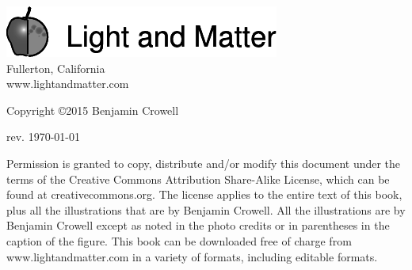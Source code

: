 \thispagestyle{empty}

\vspace{100mm}

\noindent
\includegraphics{cover/lmlogo}\\
Fullerton, California\\
www.lightandmatter.com

\vspace{20mm}
\noindent
Copyright \copyright  2015 Benjamin Crowell

\vspace{20mm}
\noindent
rev. \today{}

\vspace{6mm}
\noindent
Permission is granted to copy, distribute and/or modify this
document under the terms of the Creative Commons Attribution
Share-Alike License, which can be found at creativecommons.org. The license
applies to the entire text of this book, plus all the illustrations
that are by Benjamin Crowell. All the illustrations are by Benjamin
Crowell except as noted in the photo credits or in parentheses
in the caption of the figure.
This book can be downloaded free of charge
from www.lightandmatter.com in a variety of formats,
including editable formats.
